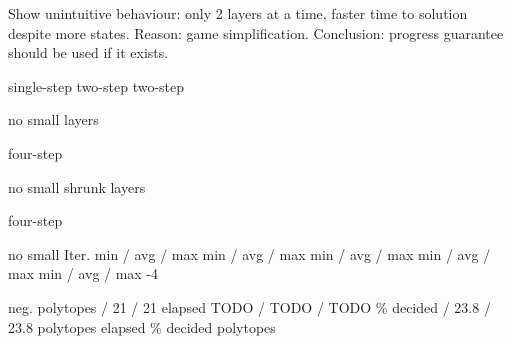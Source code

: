     Show unintuitive behaviour: only 2 layers at a time, faster time to solution despite more states.
    Reason: game simplification.
    Conclusion: progress guarantee should be used if it exists.

\stopsubsection


    \setupTABLE[frame=off,rightframe=on]
    \setupTABLE[c][first][rightframe=off]
    \setupTABLE[r][last][bottomframe=on]
    \bTABLE[align={middle,lohi}]
        \bTR[topframe=off]
            \bTH[width=0.06\textheight] \eTH
            \bTH[width=0.09\textheight] \eTH
            \bTH[width=0.17\textheight] single-step  \eTH
            \bTH[width=0.17\textheight] two-step \eTH
            \bTH[width=0.17\textheight] two-step \par no small \eTH
            \bTH[width=0.17\textheight] layers \par four-step \par no small \eTH
            \bTH[width=0.17\textheight] shrunk layers \par four-step \par no small \eTH
        \eTR
        \bTR[topframe=off]
            \bTH Iter. \eTH
            \bTH \eTH
            \bTD min / avg / max \eTD
            \bTD min / avg / max \eTD
            \bTD min / avg / max \eTD
            \bTD min / avg / max \eTD
            \bTD min / avg / max \eTD
        \eTR
        \bTR[topframe=on]
            -4 \par neg. \eTH
            \bTD polytopes \eTD
             / 21 / 21 \eTD
        \eTR
        \bTR
            \bTD elapsed \eTD
            \bTD[nc=5] TODO / TODO / TODO \eTD
        \eTR
        \bTR
            \bTD \% decided \eTD
             / 23.8 / 23.8 \eTD
        \eTR
        \bTR[topframe=on]
             \eTH
            \bTD polytopes \eTD
            \bTD  \eTD
            \bTD  \eTD
            \bTD  \eTD
            \bTD  \eTD
            \bTD  \eTD
        \eTR
        \bTR
            \bTD elapsed \eTD
            \bTD  \eTD
            \bTD  \eTD
            \bTD  \eTD
            \bTD  \eTD
            \bTD  \eTD
        \eTR
        \bTR
            \bTD \% decided \eTD
            \bTD  \eTD
            \bTD  \eTD
            \bTD  \eTD
            \bTD  \eTD
            \bTD  \eTD
        \eTR
        \bTR[topframe=on]
             \eTH
            \bTD polytopes \eTD
            \bTD  \eTD
            \bTD  \eTD
            \bTD  \eTD
            \bTD  \eTD
